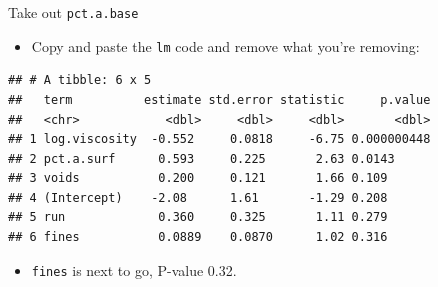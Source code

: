 \documentclass[ignorenonframetext,]{beamer}
\newenvironment{Shaded}{\begin{snugshade}}{\end{snugshade}}
\newcommand{\DataTypeTok}[1]{\textcolor[rgb]{0.13,0.29,0.53}{#1}}
\newcommand{\DecValTok}[1]{\textcolor[rgb]{0.00,0.00,0.81}{#1}}
\newcommand{\FloatTok}[1]{\textcolor[rgb]{0.00,0.00,0.81}{#1}}
\newcommand{\KeywordTok}[1]{\textcolor[rgb]{0.13,0.29,0.53}{\textbf{#1}}}
\newcommand{\NormalTok}[1]{#1}
\newcommand{\OperatorTok}[1]{\textcolor[rgb]{0.81,0.36,0.00}{\textbf{#1}}}
\newcommand{\StringTok}[1]{\textcolor[rgb]{0.31,0.60,0.02}{#1}}
\providecommand{\tightlist}{%
  \setlength{\itemsep}{0pt}\setlength{\parskip}{0pt}}
\begin{document}
\begin{frame}[fragile]{Take out \texttt{pct.a.base}}
\protect\hypertarget{take-out-pct.a.base}{}

\begin{itemize}
\tightlist
\item
  Copy and paste the \texttt{lm} code and remove what you're removing:
\end{itemize}

\small

\begin{Shaded}
\end{Shaded}

\begin{verbatim}
## # A tibble: 6 x 5
##   term          estimate std.error statistic     p.value
##   <chr>            <dbl>     <dbl>     <dbl>       <dbl>
## 1 log.viscosity  -0.552     0.0818     -6.75 0.000000448
## 2 pct.a.surf      0.593     0.225       2.63 0.0143     
## 3 voids           0.200     0.121       1.66 0.109      
## 4 (Intercept)    -2.08      1.61       -1.29 0.208      
## 5 run             0.360     0.325       1.11 0.279      
## 6 fines           0.0889    0.0870      1.02 0.316
\end{verbatim}

\normalsize

\begin{itemize}
\tightlist
\item
  \texttt{fines} is next to go, P-value 0.32.
\end{itemize}

\end{frame}
\end{document}
